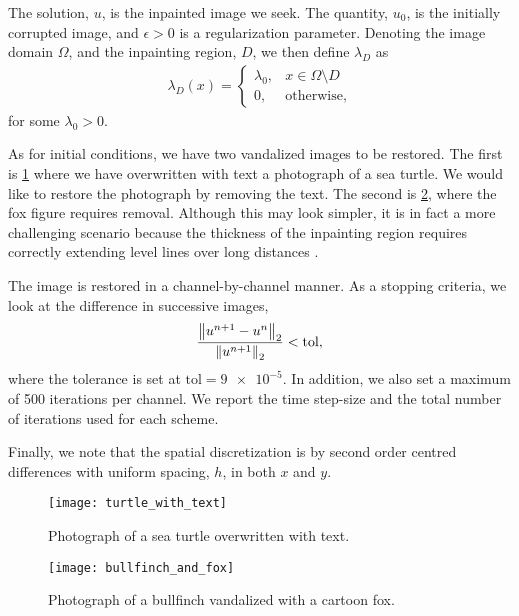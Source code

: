 The solution, $u$, is the inpainted image we seek. The quantity, $u_0$, is the initially corrupted image, and $\epsilon > 0$ is a regularization parameter. Denoting the image domain $\Omega$, and the inpainting region, $D$, we then define $\lambda_D$ as 
\begin{align}
\lambda_D(x)
= \begin{cases}
\lambda_0, & x\in \Omega\setminus D
\\
0, &\text{otherwise},
\end{cases}
\end{align}
for some $\lambda_0 > 0$.

As for initial conditions, we have two vandalized images to be restored. The first is \cref{fig:turtle with text} where we have overwritten with text a photograph of a sea turtle. We would like to restore the photograph by removing the text. The second is \cref{fig:bullfinch and fox}, where the fox figure requires removal. Although this may look simpler, it is in fact a more challenging scenario because the thickness of the inpainting region requires correctly extending level lines over long distances \cite{schonlieb2011unconditionally}.

The image is restored in a channel-by-channel manner. As a stopping criteria, we look at the difference in successive images, 
\begin{align}
        \frac{\left\lVert u^{n+1} - u^n\right\rVert_2}{\left\lVert u^{n+1}\right\rVert_2} < \mathrm{tol},
\end{align}
where the tolerance is set at $\mathrm{tol}=\num{9e-5}$.  In addition, we also set a maximum of 500 iterations per channel. We report the time step-size and the total number of iterations used for each scheme.

Finally, we note that the spatial discretization is by second order centred differences with uniform spacing, $h$, in both $x$ and $y$.
\begin{figure}[htb!]
        \centering 
\texttt{[image: turtle\_with\_text]}
\caption[Photograph of turtle overwritten with text.]{Photograph of a sea turtle overwritten with text.}
\label{fig:turtle with text}
\end{figure}

\begin{figure}[htb!]
        \centering 
\texttt{[image: bullfinch\_and\_fox]}
\caption[Photograph of a bullfinch vandalized by a cartoonish fox.]{Photograph of a bullfinch vandalized with a cartoon fox.}
\label{fig:bullfinch and fox}
\end{figure}

